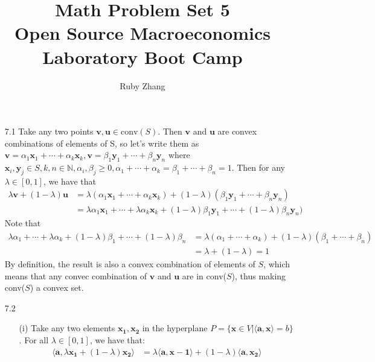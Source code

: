 \documentclass[letterpaper,12pt]{article}
\theoremstyle{definition}
\begin{document}
\title{Math Problem Set 5 \\
Open Source Macroeconomics Laboratory Boot Camp}
\author{Ruby Zhang}
\maketitle

\begin{enumerate}
  \item[7.1]
    Take any two points $\mathbf{v},\mathbf{u} \in \text{conv}(S)$. Then $\mathbf{v}$ and $\mathbf{u}$ are convex combinations of elements of S, so let's write them as $\mathbf{v} = \alpha_1\mathbf{x}_1+\cdots+\alpha_k\mathbf{x}_k, \mathbf{v} = \beta_1\mathbf{y}_1+\cdots+\beta_n\mathbf{y}_n$ where $\mathbf{x}_i,\mathbf{y}_j \in S, k,n \in \mathbb{N}, \alpha_i,\beta_j \geq 0, \alpha_1+\cdots+\alpha_k = \beta_1+\cdots+\beta_n = 1$. Then for any $\lambda \in [0,1]$, we have that
    \begin{align*}
      \lambda\mathbf{v}+(1-\lambda)\mathbf{u} &= \lambda(\alpha_1\mathbf{x}_1+\cdots+\alpha_k\mathbf{x}_k) + (1-\lambda)(\beta_1\mathbf{y}_1+\cdots+\beta_n\mathbf{y}_n) \\
      &= \lambda\alpha_1\mathbf{x}_1+\cdots+\lambda\alpha_k\mathbf{x}_k + (1-\lambda)\beta_1\mathbf{y}_1+\cdots+(1-\lambda)\beta_n\mathbf{y}_n)
    \end{align*}
    Note that
    \begin{align*}
      \lambda\alpha_1+\cdots+\lambda\alpha_k + (1-\lambda)\beta_1 + \cdots + (1-\lambda)\beta_n &= \lambda(\alpha_1+\cdots+\alpha_k)+(1-\lambda)(\beta_1+\cdots+\beta_n) \\
      &= \lambda+(1-\lambda) = 1
    \end{align*}
    By definition, the result is also a convex combination of elements of $S$, which means that any convec combination of $\mathbf{v}$ and $\mathbf{u}$ are in conv($S$), thus making conv($S$) a convex set.
  \item[7.2]
    \begin{enumerate}
      \item[(i)]
        Take any two elements $\mathbf{x_1},\mathbf{x_2}$ in the hyperplane $P = \{\mathbf{x}\in V|\langle\mathbf{a},\mathbf{x}\rangle=b\}$. For all $\lambda\in[0,1]$, we have that:
        \begin{align*}
          \langle\mathbf{a},\lambda\mathbf{x_1}+(1-\lambda)\mathbf{x_2}\rangle &= \lambda\langle\mathbf{a},\mathbf{x-1}\rangle + (1-\lambda)\langle\mathbf{a},\mathbf{x_2}\rangle \\

\end{align*}
\end{enumerate}
\end{enumerate}
\end{document}
